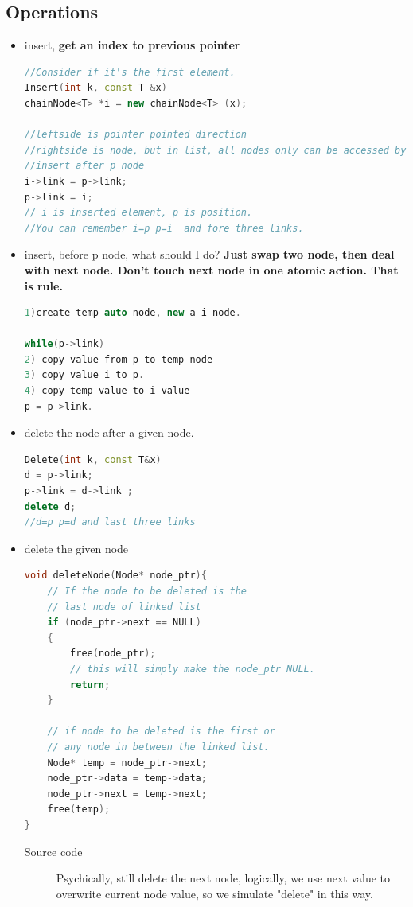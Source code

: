 \documentclass[a4paper,11pt,twoside]{book}
\begin{document}
\subsection{Operations}
\begin{itemize}
\item insert, \textbf{get an index to previous pointer}
\begin{lstlisting}[frame=single, language=c++, mathescape=true]
//Consider if it's the first element. 
Insert(int k, const T &x)
chainNode<T> *i = new chainNode<T> (x);

//leftside is pointer pointed direction
//rightside is node, but in list, all nodes only can be accessed by a pointer.
//insert after p node 
i->link = p->link;
p->link = i;
// i is inserted element, p is position.  
//You can remember i=p p=i  and fore three links.
\end{lstlisting}

\item insert, before p node, what should I do?  \textbf{Just swap two node, then deal with next node. Don't touch next node in one atomic action. That is rule. }
\begin{lstlisting}[frame=single, language=c++, mathescape=true]
1)create temp auto node, new a i node.
 
while(p->link) 
2) copy value from p to temp node
3) copy value i to p.
4) copy temp value to i value
p = p->link.  
\end{lstlisting}

\item delete the node after a given node.
\begin{lstlisting}[frame=single, language=c++]
Delete(int k, const T&x)
d = p->link;
p->link = d->link ;
delete d;
//d=p p=d and last three links
\end{lstlisting}

\item delete the given node
\begin{lstlisting}[frame=single, language=c++]
void deleteNode(Node* node_ptr){
	// If the node to be deleted is the 
	// last node of linked list
	if (node_ptr->next == NULL)
	{
		free(node_ptr);
		// this will simply make the node_ptr NULL.
		return;
	}
	
	// if node to be deleted is the first or 
	// any node in between the linked list.
	Node* temp = node_ptr->next;
	node_ptr->data = temp->data;
	node_ptr->next = temp->next;
	free(temp);
}
\end{lstlisting}
\begin{description}
	\item[Source code] Psychically, still delete the next node, logically, we use next value to overwrite current node value, so we simulate "delete" in this way. 
\end{description}


\end{itemize}
\end{document}
